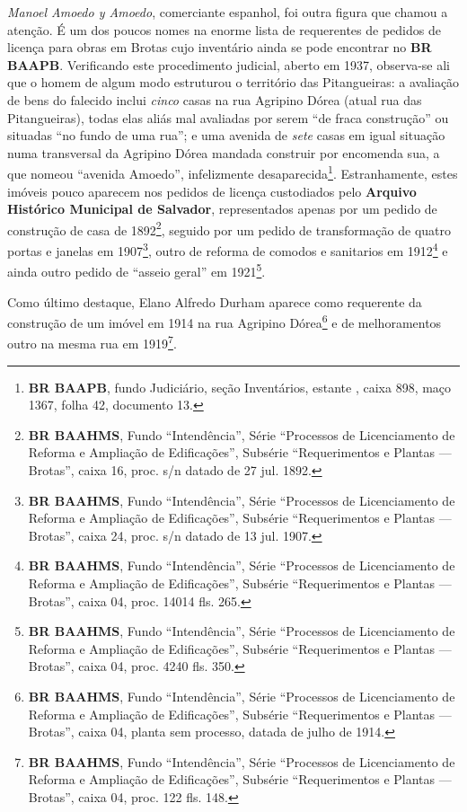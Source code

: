 \textit{Manoel Amoedo y Amoedo}, comerciante espanhol, foi outra figura que chamou a atenção. É um dos poucos nomes na enorme lista de requerentes de pedidos de licença para obras em Brotas cujo inventário ainda se pode encontrar no \textbf{BR BAAPB}. Verificando este procedimento judicial, aberto em 1937, observa-se ali que o homem de algum modo estruturou o território das Pitangueiras: a avaliação de bens do falecido inclui \textit{cinco} casas na rua Agripino Dórea (atual rua das Pitangueiras), todas elas aliás mal avaliadas por serem ``de fraca construção'' ou situadas ``no fundo de uma rua''; e uma avenida de \textit{sete} casas em igual situação numa transversal da Agripino Dórea mandada construir por encomenda sua, a que nomeou ``avenida Amoedo'', infelizmente desaparecida\footnote{\textbf{BR BAAPB}, fundo Judiciário, seção Inventários, estante , caixa 898, maço 1367, folha 42, documento 13.}. Estranhamente, estes imóveis pouco aparecem nos pedidos de licença custodiados pelo \textbf{Arquivo Histórico Municipal de Salvador}, representados apenas por um pedido de construção de casa de 1892\footnote{\textbf{BR BAAHMS}, Fundo ``Intendência'', Série ``Processos de Licenciamento de Reforma e Ampliação de Edificações'', Subsérie ``Requerimentos e Plantas --- Brotas'', caixa 16, proc. s/n datado de 27 jul. 1892.}, seguido por um pedido de transformação de quatro portas e janelas em 1907\footnote{\textbf{BR BAAHMS}, Fundo ``Intendência'', Série ``Processos de Licenciamento de Reforma e Ampliação de Edificações'', Subsérie ``Requerimentos e Plantas --- Brotas'', caixa 24, proc. s/n datado de 13 jul. 1907.}, outro de reforma de comodos e sanitarios em 1912\footnote{\textbf{BR BAAHMS}, Fundo ``Intendência'', Série ``Processos de Licenciamento de Reforma e Ampliação de Edificações'', Subsérie ``Requerimentos e Plantas --- Brotas'', caixa 04, proc. 14014 fls. 265.} e ainda outro pedido de ``asseio geral'' em 1921\footnote{\textbf{BR BAAHMS}, Fundo ``Intendência'', Série ``Processos de Licenciamento de Reforma e Ampliação de Edificações'', Subsérie ``Requerimentos e Plantas --- Brotas'', caixa 04, proc. 4240 fls. 350.}.

Como último destaque, Elano Alfredo Durham aparece como requerente da construção de um imóvel em 1914 na rua Agripino Dórea\footnote{\textbf{BR BAAHMS}, Fundo ``Intendência'', Série ``Processos de Licenciamento de Reforma e Ampliação de Edificações'', Subsérie ``Requerimentos e Plantas --- Brotas'', caixa 04, planta sem processo, datada de julho de 1914.} e de melhoramentos outro na mesma rua em 1919\footnote{\textbf{BR BAAHMS}, Fundo ``Intendência'', Série ``Processos de Licenciamento de Reforma e Ampliação de Edificações'', Subsérie ``Requerimentos e Plantas --- Brotas'', caixa 04, proc. 122 fls. 148.}.

